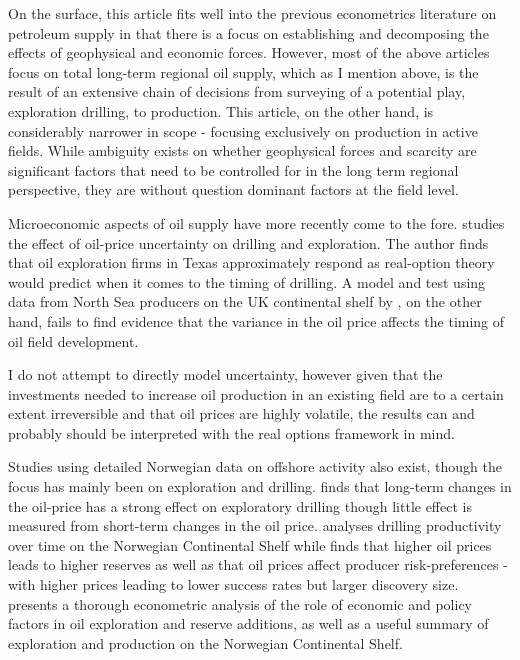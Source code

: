 \documentclass[12pt]{article}
\begin{document}
On the surface, this article fits well into the previous econometrics literature on petroleum supply in that there is a focus on establishing and decomposing the effects of geophysical and economic forces. However, most of the above articles focus on total long-term regional oil supply, which as I mention above, is the result of an extensive chain of decisions from surveying of a potential play, exploration drilling, to production. This article, on the other hand, is considerably narrower in scope - focusing exclusively on production in active fields. While ambiguity exists on whether geophysical forces and scarcity are significant factors that need to be controlled for in the long term regional perspective, they are without question dominant factors at the field level.

Microeconomic aspects of oil supply have more recently come to the fore. \citet{kellogg_effect_2014} studies the effect of oil-price uncertainty on drilling and exploration. The author finds that oil exploration firms in Texas approximately respond as real-option theory would predict when it comes to the timing of drilling.  A model and test using data from North Sea producers on the UK continental shelf by \citet{hurn_geology_1994}, on the other hand, fails to find evidence that the variance in the oil price affects the timing of oil field development.  

I do not attempt to directly model uncertainty, however given that the investments needed to increase oil production in an existing field are to a certain extent irreversible and that oil prices are highly volatile, the results can and probably should be interpreted with the real options framework in mind.  

Studies using detailed Norwegian data on offshore activity also exist, though the focus has mainly been on exploration and drilling.  \citet{mohn_exploration_2008} finds that long-term changes in the oil-price has a strong effect on exploratory drilling though little effect is measured from short-term changes in the oil price. \citet{osmundsen_exploration_2010} analyses drilling productivity over time on the Norwegian Continental Shelf while \citet{mohn_efforts_2008} finds that higher oil prices leads to higher reserves as well as that oil prices affect producer risk-preferences - with higher prices leading to lower success rates but larger discovery size. \citet{mohn_elastic_2010} presents a thorough econometric analysis of the role of economic and policy factors in oil exploration and reserve additions, as well as a useful summary of exploration and production on the Norwegian Continental Shelf.
\end{document}

